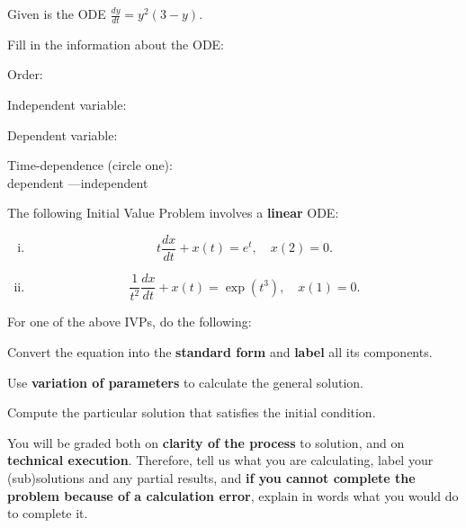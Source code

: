 \documentclass[10pt,twoside,sfsidenotes]{tufte-handout}
\date{} %
\begin{document}
\setlength\abovedisplayskip{2pt}
\setlength\belowdisplayskip{2pt}
\setlength\abovedisplayshortskip{2pt}
\setlength\belowdisplayshortskip{2pt}

\begin{fullwidth}
  \begin{question} %
    Given is the ODE \quad \(\displaystyle \frac{dy}{dt} = y^{2}(3-y)\).

    Fill in the information about the ODE:

    \begin{colenumerate}[2]
      \item Order: \blank[width=0.5in]{}
      \item Independent variable: \blank[width=0.5in]{}
      \item Dependent variable: \blank[width=0.5in]{}
      \item Time-dependence (circle one): \\ dependent \quad---\quad independent
    \end{colenumerate}
  \end{question}
\end{fullwidth}


\begin{fullwidth}
  \begin{question} %
    The following Initial Value Problem involves a \textbf{linear} ODE:
    \begin{enumerate}[(i)]
      \item \[t \frac{dx}{dt} + x(t) = e^{t}, \quad x(2) = 0.\]
      \item \[\frac{1}{t^{2}} \frac{dx}{dt} + x(t) = \exp\left(t^{3}\right), \quad x(1) = 0.\]
    \end{enumerate}
    For one of the above IVPs, do the following:
    \begin{compactenum}[(a)]
      \item Convert the equation into the \textbf{standard form} and \textbf{label} all its components.
      \item Use \textbf{variation of parameters} to calculate the general solution.
      \item Compute the particular solution that satisfies the initial condition.
    \end{compactenum}

    {\footnotesize You will be graded both on \textbf{clarity of the process} to solution, and on \textbf{technical execution}. 
    Therefore, tell us what you are calculating, label your (sub)solutions and any partial results, and 
    \textbf{if you cannot complete the problem because of a calculation error}, explain in words what you would do to complete it.}
    \solspace{1.0in}
  \end{question}
  \end{fullwidth}
\end{document}
